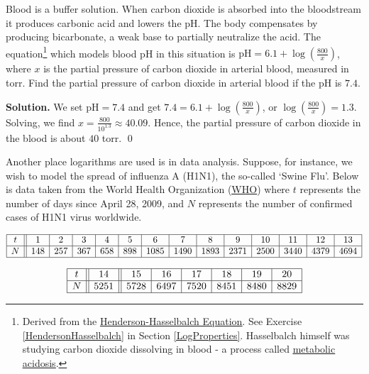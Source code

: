 \begin{ex}  Blood is a buffer solution. When carbon dioxide is absorbed into the bloodstream it produces carbonic acid and lowers the pH.  The body compensates by producing bicarbonate, a weak base to partially neutralize the acid.  The equation\footnote{Derived from the \href{http://en.wikipedia.org/wiki/Henderson-Hasselbalch_equation}{\underline{Henderson-Hasselbalch Equation}}. See Exercise \ref{HendersonHasselbalch} in Section \ref{LogProperties}.  Hasselbalch himself was studying carbon dioxide dissolving in blood - a process called \href{http://en.wikipedia.org/wiki/Metabolic_acidosis}{\underline{metabolic acidosis}}.}   which models blood pH in this situation is $\mbox{pH} = 6.1 + \log\left(\frac{800}{x} \right)$, where $x$ is the partial pressure of carbon dioxide in arterial blood, measured in torr. Find the partial pressure of carbon dioxide in arterial blood if the pH is $7.4$.

\smallskip

{\bf Solution.}  We set $\mbox{pH} = 7.4$ and get $ 7.4 = 6.1 + \log\left(\frac{800}{x} \right)$, or $\log\left(\frac{800}{x} \right) = 1.3$.  Solving, we find $x = \frac{800}{10^{1.3}} \approx 40.09$.  Hence, the partial pressure of carbon dioxide in the blood is about $40$ torr. \qed


\end{ex}

Another place logarithms are used is in data analysis. Suppose, for instance, we wish to model the spread of influenza A (H1N1), the so-called `Swine Flu'.  Below is data taken from the World Health Organization (\href{http://www.who.int/csr/disease/swineflu/updates/en/index.html}{\underline{WHO}}) where $t$ represents the number of days since April 28, 2009, and $N$ represents the number of confirmed cases of H1N1 virus worldwide.

\[ \begin{array}{|c||c|c|c|c|c|c|c|c|c|c|c|c|c|}  \hline

t & 1 & 2 & 3 & 4 & 5 & 6 & 7 & 8 & 9 & 10 & 11 & 12 & 13  \\ \hline

N & 148 & 257 &   367 & 658 & 898 & 1085 & 1490 & 1893 & 2371 & 2500 & 3440 & 4379 & 4694  \\ \hline \end{array} \]


\[\begin{array}{|c||c||c|c|c|c|c|c|} \hline

t & 14 & 15 & 16 & 17 & 18 & 19& 20  \\ \hline 

N & 5251 & 5728 & 6497 & 7520 & 8451 & 8480 & 8829    \\ \hline \end{array} \]

